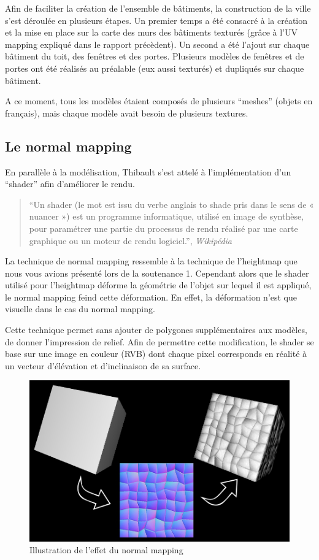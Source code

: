 \documentclass[11pt]{report}
\begin{document}
Afin de faciliter la création de l’ensemble de bâtiments, la construction de la ville s’est déroulée en plusieurs étapes. Un premier temps a été consacré à la création et la mise en place sur la carte des murs des bâtiments texturés (grâce à l’UV mapping expliqué dans le rapport précèdent). Un second a été l’ajout sur chaque bâtiment du toit, des fenêtres et des portes. Plusieurs modèles de fenêtres et de portes ont été réalisés au préalable (eux aussi texturés) et dupliqués sur chaque bâtiment.

A ce moment, tous les modèles étaient composés de plusieurs ``meshes'' (objets en français), mais  chaque modèle avait besoin de plusieurs textures.

\subsection{Le normal mapping}

En parallèle à la modélisation, Thibault s’est attelé à l’implémentation d’un ``shader'' afin d’améliorer le rendu.

\begin{quote}
``Un shader (le mot est issu du verbe anglais to shade pris dans le sens de « nuancer ») est un programme informatique, utilisé en image de synthèse, pour paramétrer une partie du processus de rendu réalisé par une carte graphique ou un moteur de rendu logiciel.'', \emph{Wikipédia}
\end{quote}

La technique de normal mapping ressemble à la technique de l’heightmap que nous vous avions présenté lors de la soutenance 1. Cependant alors que le shader utilisé pour l’heightmap déforme la géométrie de l’objet sur lequel il est appliqué, le normal mapping feind cette déformation. En effet, la déformation n’est que visuelle dans le cas du normal mapping.

Cette technique permet sans ajouter de polygones supplémentaires aux modèles, de donner l’impression de relief. Afin de permettre cette modification, le shader se base sur une image en couleur (RVB) dont chaque pixel corresponds en réalité à un vecteur d'élévation et d'inclinaison de sa surface.

\begin{figure}[htbp]
\centering
\includegraphics[scale=0.30]{normal_mapping.jpg}
\caption{Illustration de l'effet du normal mapping}
\end{figure}
\end{document}
